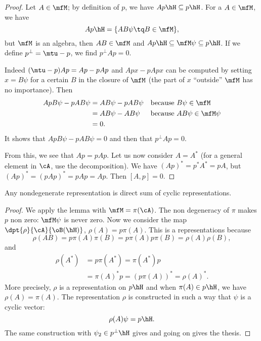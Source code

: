 \begin{proof}
	Let $A\in\mfM$; by definition of $p$, we have $Ap\hH\subseteq p\hH$. For a $A\in\mfM$, we have
	\begin{equation}
		Ap\hH=\{ AB\psi\tq B\in\mfM \},
	\end{equation}
	but $\mfM$ is an algebra, then $AB\in\mfM$ and $Ap\hH\subseteq\mfM\psi\subseteq p\hH$. If we define $p^{\perp}=\mtu-p$, we find $p^{\perp}Ap=0$.

	Indeed $(\mtu-p)Ap=Ap-pAp$ and $Apx-pApx$ can be computed by setting $x=B\psi$ for a certain $B$ in the closure of $\mfM$ (the part of $x$ ``outside'' $\mfM$ has no importance). Then
	\begin{equation}
		\begin{aligned}
			ApB \psi-pAB\psi & =AB\psi-pAB\psi &  & \textrm{because $B\psi\in\mfM$}      \\
			                 & =AB\psi-AB\psi  &  & \textrm{because $AB\psi\in\mfM\psi$} \\
			                 & =0.
		\end{aligned}
	\end{equation}
	It shows that $ApB\psi-pAB\psi=0$ and then that $p^{\perp}Ap=0$.

	From this, we see that $Ap=pAp$. Let us now consider $A=A^*$ (for a general element in $\cA$, use the decomposition). We have $(Ap)^*=p^*A^*=pA$, but $(Ap)^*=(pAp)^*=pAp=Ap$. Then $[A,p]=0$.


\end{proof}


\begin{proposition}
	Any nondegenerate representation is direct sum of cyclic representations.
\end{proposition}

\begin{proof}
	We apply the lemma with $\mfM=\pi(\cA)$. The non degeneracy of $\pi$ makes $p$ non zero: $\mfM\psi$ is never zero. Now we consider the map $\dpt{\rho}{\cA}{\oB(\hH)}$, $\rho(A)=p \pi(A)$. This is a representations because
	\begin{equation}
		\rho(AB)=p\pi(A)\pi(B)
		=p\pi(A)p\pi(B)
		=\rho(A)\rho(B),
	\end{equation}
	and
	\begin{equation}
		\begin{split}
			\rho(A^*)&=p\pi(A^*)=\pi(A^*)p\\
			&=\pi(A)^*p=(p\pi(A))^*=\rho(A)^*.
		\end{split}
	\end{equation}
	More precisely, $\rho$ is a representation on $p\hH$ and when $\pi(A)\in p\hH$, we have $\rho(A)=\pi(A)$. The representation $\rho$ is constructed in such a way that $\psi$ is a cyclic vector:
	\[
		\rho(A)\psi=p\hH.
	\]
	The same construction with $\psi_2\in p^{\perp}\hH$ gives and going on gives the thesis.
\end{proof}


